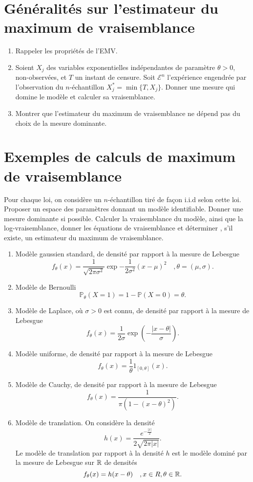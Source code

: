 \section{Généralités sur l'estimateur du maximum de vraisemblance}
\begin{enumerate}
\item Rappeler les propriétés de l'EMV.
\item Soient $X_j$ des variables exponentielles indépendantes de paramètre $\theta>0$, non-observées, et $T$ un instant de censure. Soit $\mathcal E^n$ l'expérience engendrée par l'observation du $n$-échantillon $X_j^*=\min{\{T,X_j\}}$. Donner une mesure qui domine le modèle et calculer sa vraisemblance.
\item Montrer que l'estimateur du maximum de vraisemblance ne dépend pas du choix de la mesure dominante.  
\end{enumerate}
\section{Exemples de calculs de maximum de vraisemblance}

Pour chaque loi, on considère un $n$-échantillon tiré de façon i.i.d selon cette loi. Proposer un espace des paramètres donnant un modèle identifiable. Donner une mesure dominante si possible. Calculer la vraisemblance du modèle, ainsi que la log-vraisemblance, donner les équations de vraisemblance et déterminer , s'il existe, un estimateur du maximum de vraisemblance.\\

\begin{enumerate}
\item Modèle gaussien standard, de densité par rapport à la mesure de Lebesgue \[f_\theta(x)=\frac{1}{\sqrt{2\pi \sigma^2}} \exp{-\frac{1}{2\sigma^2}}(x-\mu)^2\quad, \theta=(\mu,\sigma).\]
\item Modèle de Bernoulli \[\mathbb P_\theta(X=1)=1-\mathbb P(X=0)=\theta.\]
\item Modèle de Laplace, où $\sigma>0$ est connu, de densité par rapport à la mesure de Lebesgue \[f_\theta(x)=\frac{1}{2\sigma}\exp{(-\frac{|x-\theta|}{\sigma})}.\]
\item Modèle uniforme, de densité par rapport à la mesure de Lebesgue \[f_\theta(x)=\frac{1}{\theta}1_{[0,\theta]}(x).\]
\item Modèle de Cauchy, de densité par rapport à la mesure de Lebesgue \[f_\theta(x)=\frac{1}{\pi(1-(x-\theta)^2)}.\]
\item Modèle de translation. On considère la densité \[h(x)=\frac{ e^{-\frac{|x|}{2}}}{2\sqrt{2\pi|x|}}.\] Le modèle de translation par rapport à la densité $h$ est le modèle dominé par la mesure de Lebesgue sur $\mathbb R$ de densités 
\[f_\theta(x)=h(x-\theta)\quad, x\in R,\theta \in \mathbb R.\]
\end{enumerate}

